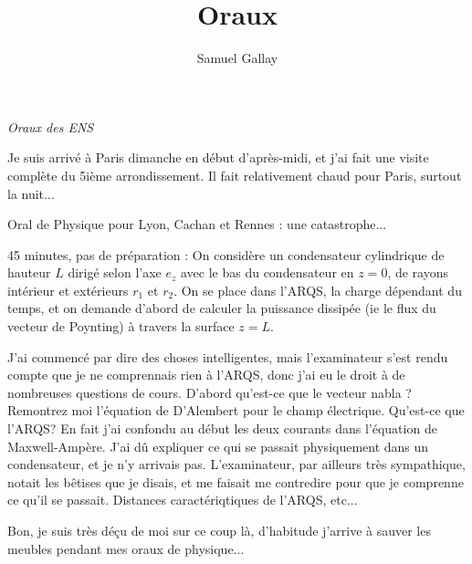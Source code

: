 \documentclass[french,a4paper, 12pt]{article}
\title{Oraux}
\author{Samuel Gallay}
\begin{document}
\maketitle

\emph{Oraux des ENS}

\vspace{5px}

Je suis arrivé à Paris dimanche en début d'après-midi, et j'ai fait une visite complète du 5ième arrondissement. Il fait relativement chaud pour Paris, surtout la nuit...

\vspace{5px}

Oral de Physique pour Lyon, Cachan et Rennes : une catastrophe...

45 minutes, pas de préparation : On considère un condensateur cylindrique de hauteur $L$ dirigé selon l'axe $e_z$ avec le bas du condensateur en $z = 0$, de rayons intérieur et extérieurs $r_1$ et $r_2$. On se place dans l'ARQS, la charge dépendant du temps, et on demande d'abord de calculer la puissance dissipée (ie le flux du vecteur de Poynting) à travers la surface $z = L$.

J'ai commencé par dire des choses intelligentes, mais l'examinateur s'est rendu compte que je ne comprennais rien à l'ARQS, donc j'ai eu le droit à de nombreuses questions de cours. D'abord qu'est-ce que le vecteur nabla ? Remontrez moi l'équation de D'Alembert pour le champ électrique. Qu'est-ce que l'ARQS? En fait j'ai confondu au début  les deux courants dans l'équation de Maxwell-Ampère. J'ai dû expliquer ce qui se passait physiquement dans un condensateur, et je n'y arrivais pas. L'examinateur, par ailleurs très sympathique, notait les bêtises que je disais, et me faisait me contredire pour que je comprenne ce qu'il se passait. Distances caractériqtiques de l'ARQS, etc...

Bon, je suis très déçu de moi sur ce coup là, d'habitude j'arrive à sauver les meubles pendant mes oraux de physique...
\end{document}
